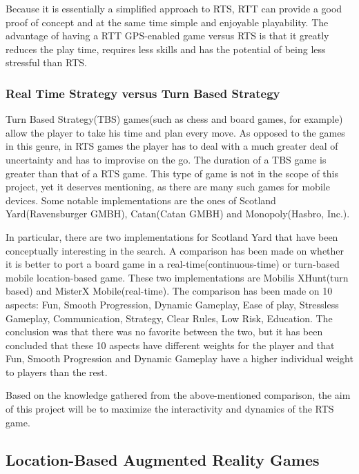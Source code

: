 Because it is essentially a simplified approach to RTS\cite{rttvsrts}, RTT can
provide a good proof of concept and at the same time simple and enjoyable
playability. The advantage of having a RTT GPS-enabled game versus RTS is that
it greatly reduces the play time, requires less skills and has the potential of
being less stressful than RTS.\newline

\subsubsection{Real Time Strategy versus Turn Based Strategy}

Turn Based Strategy(TBS) games\cite{rtsvstbs}(such as chess and board games, for
example) allow the player to take his time and plan every move. As opposed to
the games in this genre, in RTS games the player has to deal with a much greater
deal of uncertainty and has to improvise on the go\cite{rttvsrts3}. The duration of a
TBS game is greater than that of a RTS game. This type of game is not in the scope of
this project, yet it deserves mentioning, as there are many such games for
mobile devices. Some notable implementations are the ones of Scotland
Yard(Ravensburger GMBH), Catan(Catan GMBH) and Monopoly(Hasbro, Inc.).\newline

In particular, there are two implementations for Scotland Yard that have been
conceptually interesting in the search. A comparison has been
made\cite{rttvsrts2} on whether it is better to port a board game in a
real-time(continuous-time) or turn-based mobile location-based game. These two
implementations are Mobilis XHunt(turn based) and MisterX Mobile(real-time). The
comparison has been made on 10 aspects: Fun, Smooth Progression, Dynamic
Gameplay, Ease of play, Stressless Gameplay, Communication, Strategy, Clear
Rules, Low Risk, Education. The conclusion was that there was no favorite
between the two, but it has been concluded that these 10 aspects have different
weights for the player and that Fun, Smooth Progression and Dynamic Gameplay
have a higher individual weight to players than the rest.\cite[p.5]{rttvsrts2}
\newline

Based on the knowledge gathered from the above-mentioned comparison, the aim of
this project will be to maximize the interactivity and dynamics of the RTS game.


\subsection{Location-Based Augmented Reality Games}

